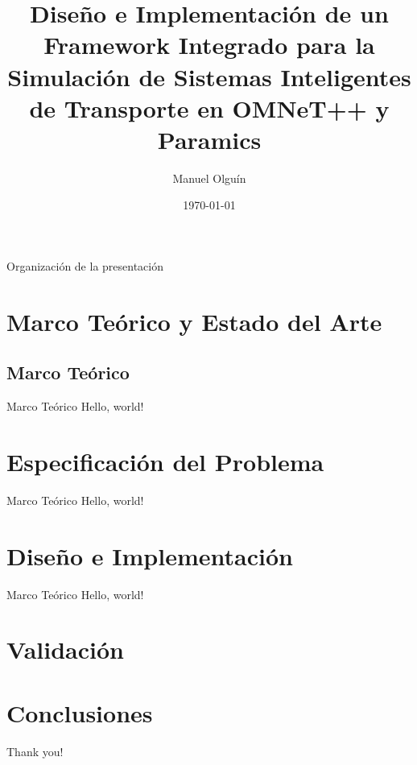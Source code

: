 \documentclass{beamer}
\title{Diseño e Implementación de un Framework Integrado para la Simulación de Sistemas Inteligentes de Transporte en OMNeT++ y Paramics}
\date{\today}
\author{Manuel Olguín}
\institute{\texttt{[image: figuras/fcfm\_dcc\_png.png]}}
\begin{document}
    \maketitle
    
    \begin{frame}{Organización de la presentación}
        \tableofcontents
    \end{frame}

    \section{Marco Teórico y Estado del Arte}
    \subsection{Marco Teórico}
    \begin{frame}{Marco Teórico}
        Hello, world!
    \end{frame}
    
    \section{Especificación del Problema}
    \begin{frame}{Marco Teórico}
        Hello, world!
    \end{frame}

    \section{Diseño e Implementación}
    \begin{frame}{Marco Teórico}
    Hello, world!
    \end{frame}

    \section{Validación}
    \section{Conclusiones}
    \begin{frame}[standout]
        Thank you!
    \end{frame}
\end{document}
